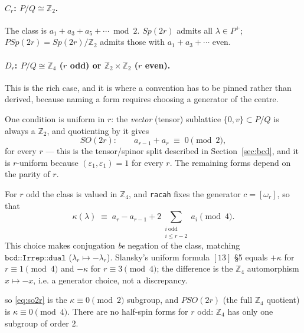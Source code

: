 \documentclass[11pt,a4paper]{article}
\theoremstyle{plain}
\theoremstyle{definition}
\newcommand{\ZZ}{\mathbb{Z}}
\newcommand{\code}[1]{\texttt{#1}}
\begin{document}
\paragraph{$C_r$: $P/Q\cong\ZZ_2$.} The class is
$a_1+a_3+a_5+\cdots \bmod 2$. $Sp(2r)$ admits all $\lambda\in P^+$;
$PSp(2r)=Sp(2r)/\ZZ_2$ admits those with $a_1+a_3+\cdots$ even.

\paragraph{$D_r$: $P/Q\cong\ZZ_4$ ($r$ odd) or $\ZZ_2\times\ZZ_2$ ($r$ even).}
This is the rich case, and it is where a convention has to be pinned rather
than derived, because naming a form requires choosing a generator of the
centre.

One condition is uniform in $r$: the \emph{vector} (tensor) sublattice
$\{0,v\}\subset P/Q$ is always a $\ZZ_2$, and quotienting by it gives
\begin{equation}\label{eq:so2r}
  SO(2r):\qquad a_{r-1} + a_r \;\equiv\; 0 \pmod 2 ,
\end{equation}
for every $r$ --- this is the tensor/spinor split described in
Section~\ref{sec:bcd},
and it is $r$-uniform because $(\varepsilon_1,\varepsilon_1)=1$ for every $r$.
The remaining forms depend on the parity of $r$.

For $r$ odd the class is valued in $\ZZ_4$, and \code{racah} fixes the
generator $c=[\omega_r]$, so that
\begin{equation}\label{eq:d4class}
  \kappa(\lambda) \;\equiv\;
    a_r - a_{r-1} + 2\!\!\sum_{\substack{i \ \mathrm{odd} \\ i \le r-2}}\!\! a_i
  \pmod 4 .
\end{equation}
This choice makes conjugation \emph{be} negation of the class, matching
$\code{bcd::Irrep::dual}$ ($\lambda_r\mapsto-\lambda_r$). Slansky's uniform
formula $[13]$ \S5 equals $+\kappa$ for $r\equiv 1 \pmod 4$ and $-\kappa$ for
$r\equiv 3\pmod 4$; the difference is the $\ZZ_4$ automorphism $x\mapsto -x$,
i.e. a generator choice, not a discrepancy.

so \eqref{eq:so2r} is the $\kappa\equiv 0\pmod 2$ subgroup, and $PSO(2r)$ (the
full $\ZZ_4$ quotient) is $\kappa\equiv 0 \pmod 4$. There are no half-spin
forms for $r$ odd: $\ZZ_4$ has only one subgroup of order $2$.
\end{document}
